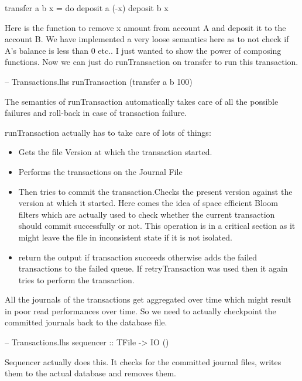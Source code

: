 \documentclass[11pt,a4paper]{article}
\begin{document}
\begin{code}[name=Transactions]
transfer a b x = do 
  deposit a (-x) 
  deposit b x
\end{code}

Here is the function to remove x amount from account A and deposit it to
the account B. We have implemented a very loose semantics here as to not
check if A's balance is less than 0 etc.. I just wanted to show the power
of composing functions. Now we can just do runTransaction on transfer to
run this transaction.

\begin{code}[name=Transactions]
-- Transactions.lhs
runTransaction (transfer a b 100)
\end{code}

The semantics of runTransaction automatically
takes care of all the possible failures and roll-back in case of
transaction failure.

runTransaction actually has to take care of lots of things:

\begin{itemize}
\item Gets the file Version at which the transaction started.
\item Performs the transactions on the Journal File 
\item Then tries to commit the transaction.Checks the present version against the version at which it started. Here comes the idea of space efficient Bloom filters which are actually used to check whether the current transaction should commit successfully or not. This operation is in a critical section as it might leave the file in inconsistent state if it is not isolated. 
\item return the output if transaction succeeds otherwise adds the failed transactions to the failed queue. If retryTransaction was used then it again tries to perform the transaction. 
\end{itemize}

All the journals of the transactions get aggregated over time which might result in poor read performances over time. So we need to actually checkpoint the committed journals back to the database file.

\begin{code}[name=Transactions]
-- Transactions.lhs
sequencer :: TFile -> IO () 
\end{code}

Sequencer actually does this. It checks for the committed journal files, writes them to the actual database and removes them. 
\end{document}
